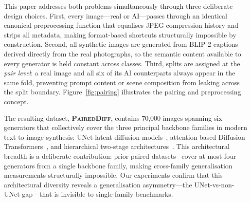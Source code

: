\documentclass[journal]{IEEEtran}
\newcommand{\datasetname}{\textsc{PairedDiff}}
\begin{document}
This paper addresses both problems simultaneously through three
deliberate design choices.
First, every image---real or AI---passes through an identical
canonical preprocessing function that equalises JPEG compression
history and strips all metadata, making format-based shortcuts
structurally impossible by construction.
Second, all synthetic images are generated from BLIP-2
captions~\cite{li2023blip2} derived directly from the real
photographs, so the semantic content available to every generator
is held constant across classes.
Third, splits are assigned at the \emph{pair level}: a real image
and all six of its AI counterparts always appear in the same fold,
preventing prompt content or scene composition from leaking across
the split boundary.
Figure~\ref{fig:pairing} illustrates the pairing and preprocessing
concept.

The resulting dataset, \textbf{\datasetname}, contains 70{,}000
images spanning six generators that collectively cover the three
principal backbone families in modern text-to-image synthesis:
UNet latent diffusion models~\cite{rombach2022ldm,podell2024sdxl},
attention-based Diffusion Transformers~\cite{chen2024pixart,flux2024bfl},
and hierarchical two-stage
architectures~\cite{razzhigaev2023kandinsky,pernias2023wuerstchen}.
This architectural breadth is a deliberate contribution: prior paired
datasets~\cite{jiang2024passive} cover at most four generators from
a single backbone family, making cross-family generalisation
measurements structurally impossible.
Our experiments confirm that this architectural diversity reveals a
generalisation asymmetry---the UNet-vs-non-UNet gap---that is
invisible to single-family benchmarks.
\end{document}

